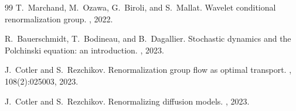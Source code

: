 \documentclass[11pt]{amsart}
\theoremstyle{remark}
\numberwithin{equation}{section}
\begin{document}
\begin{thebibliography}{99}
T.~Marchand, M.~Ozawa, G.~Biroli, and S.~Mallat.
\newblock Wavelet conditional renormalization group.
, 2022.

R.~Bauerschmidt, T.~Bodineau, and B.~Dagallier.
\newblock Stochastic dynamics and the {P}olchinski equation: an introduction.
, 2023.

J.~Cotler and S.~Rezchikov.
\newblock Renormalization group flow as optimal transport.
, 108(2):025003, 2023.

J.~Cotler and S.~Rezchikov.
\newblock Renormalizing diffusion models.
, 2023.

\end{thebibliography}
\end{document}

